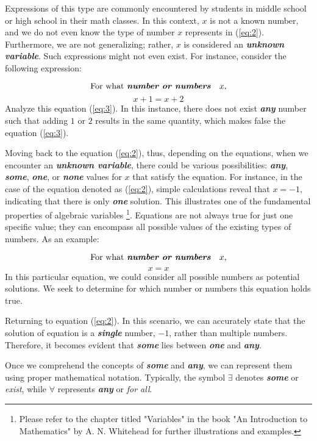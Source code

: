 Expressions of this type are commonly encountered by students in middle school or high school in their math classes. In this context, $x$ is not a known number, and we do not even know the type of number $x$ represents in (\ref{eq:2}). Furthermore, we are not generalizing; rather, $x$ is considered an \textbf{\textit{unknown variable}}. Such expressions might not even exist. For instance, consider the following expression:

\begin{equation} \label{eq:3}
    \text{For what \textbf{\textit{number or numbers}}}\quad x,
\end{equation}
\[
  x + 1 = x + 2
\]
Analyze this equation (\ref{eq:3}). In this instance, there does not exist \textbf{\textit{any}} number such that adding $1$ or $2$ results in the same quantity, which makes false the equation (\ref{eq:3}).

Moving back to the equation (\ref{eq:2}), thus, depending on the equations, when we encounter an \textbf{\textit{unknown variable}}, there could be various possibilities: \textbf{\textit{any}}, \textbf{\textit{some}}, \textbf{\textit{one}}, or \textbf{\textit{none}} values for $x$ that satisfy the equation. For instance, in the case of the equation denoted as (\ref{eq:2}), simple calculations reveal that $x = -1$, indicating that there is only \textbf{\textit{one}} solution. This illustrates one of the fundamental properties of algebraic variables \footnote{Please refer to the chapter titled "Variables" in the book "An Introduction to Mathematics" by A. N. Whitehead for further illustrations and examples.}. Equations are not always true for just one specific value; they can encompass all possible values of the existing types of numbers. As an example:

\begin{equation} \label{eq:4}
    \text{For what \textbf{\textit{number or numbers}}}\quad x,
\end{equation}
\[
  x = x
\]
In this particular equation, we could consider all possible numbers as potential solutions. We seek to determine for which number or numbers this equation holds true.

Returning to equation (\ref{eq:2}). In this scenario, we can accurately state that the solution of equation is a \textbf{\textit{single}} number, $-1$, rather than multiple numbers. Therefore, it becomes evident that \textbf{\textit{some}} lies between \textbf{\textit{one}} and \textbf{\textit{any}}.

Once we comprehend the concepts of \textbf{\textit{some}} and \textbf{\textit{any}}, we can represent them using proper mathematical notation. Typically, the symbol $\exists$ denotes \textbf{\textit{some}} or \textit{exist}, while $\forall$ represents \textbf{\textit{any}} or \textit{for all}.
  
